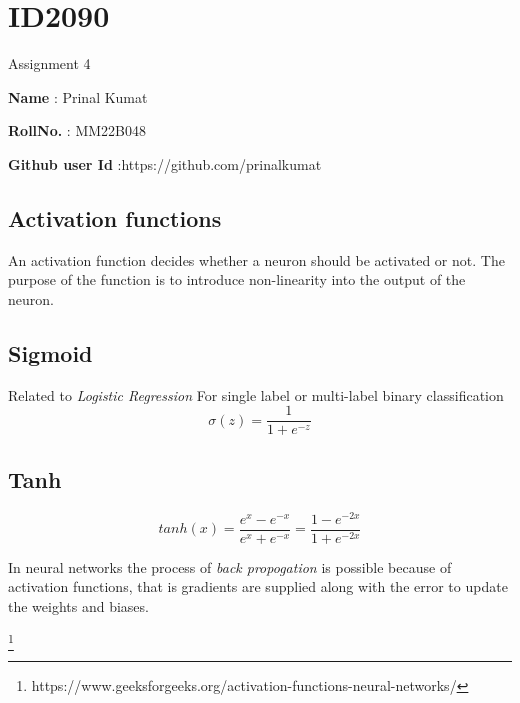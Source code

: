 \documentclass[a4paper, 12pt]{article}
\begin{document}
\section*{ID2090}

Assignment 4

\textbf{Name }: Prinal Kumat 

\textbf{RollNo. } : MM22B048

\textbf{Github user Id } :https://github.com/prinalkumat

\subsection*{Activation functions}
An activation function decides whether a neuron should be activated or not.
The purpose of the function is to introduce non-linearity into the output of the neuron.

\subsection{Sigmoid}
Related to 
\emph{Logistic Regression}  
For single label or multi-label binary classification	
\begin{equation}
\sigma(z) = \frac{1} {1 + e^{-z}}
\end{equation}

\subsection{Tanh}
\begin{equation}
tanh(x) = \frac{e^x - e^{-x}}{e^{x} + e^{-x}} = \frac{1 - e^{-2x}}{1 + e^{-2x}}
\end{equation} 

In neural networks the process of 
\emph{back propogation}   
is possible because of 
activation functions, that is gradients are supplied along 
with the error to update the 
weights and biases.

\footnote{https://www.geeksforgeeks.org/activation-functions-neural-networks/}
 
\end{document}
